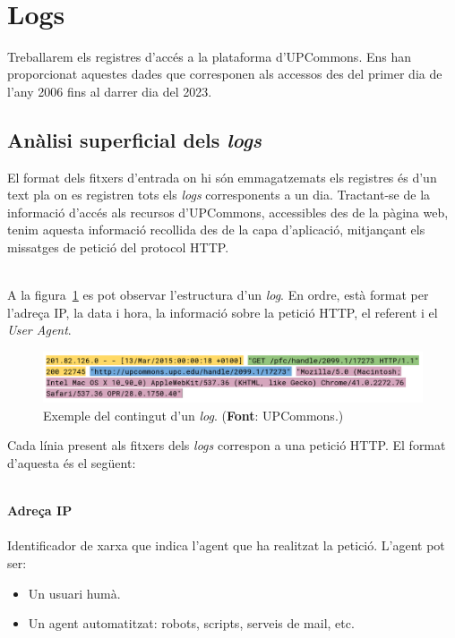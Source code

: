 \noindent \\
\section{Logs}\label{sec:logs-processing}

Treballarem els registres d'accés a la plataforma d'\gls{UPCommons}.
Ens han proporcionat aquestes dades que corresponen als accessos des del primer dia de l'any 2006 fins al darrer dia del 2023.

\clearpage

\subsection{Anàlisi superficial dels \textit{\gls{log}s}}\label{subsec:log-analysis}

El format dels fitxers d'entrada on hi són emmagatzemats els registres és d'un text pla on es registren tots els \textit{\gls{log}s} corresponents a un dia.
Tractant-se de la informació d'accés als recursos d'\gls{UPCommons}, accessibles des de la pàgina web,
tenim aquesta informació recollida des de la capa d'aplicació, mitjançant els missatges de petició del protocol \gls{HTTP}.

\noindent \\
A la figura~\ref{fig:example-log} es pot observar l'estructura d'un \textit{\gls{log}}.
En ordre, està format per l'adreça \gls{IP}, la data i hora, la informació sobre la petició \gls{HTTP}, el referent i el \textit{User Agent}.

\begin{figure}[htbp]
    \centerline{\includegraphics[width=1\textwidth]{figures/example-log}}
    \captionsetup{justification=centering}
    \caption[Exemple del contingut d'un \textit{\gls{log}}.]{Exemple del contingut d'un \textit{\gls{log}}. (\textbf{Font}: \gls{UPCommons}.)}\label{fig:example-log}
\end{figure}

\noindent
Cada línia present als fitxers dels \textit{\gls{log}s} correspon a una petició \gls{HTTP}.
El format d'aquesta és el següent:

\noindent \\
\textbf{Adreça \gls{IP}} \\ \\
Identificador de xarxa que indica l'agent que ha realitzat la petició.
L'agent pot ser:
\begin{itemize}
    \item Un usuari humà.
    \item Un agent automatitzat: robots, scripts, serveis de mail, etc. \\
\end{itemize}

